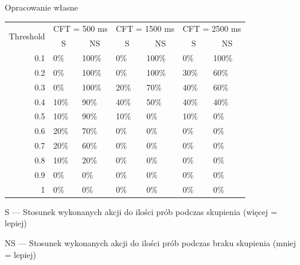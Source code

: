 \documentclass[skorowidz,skroty]{dyplomWEZUT}
\begin{document}
{Opracowanie własne}
{
    \begin{threeparttable}
        \begin{tabularx}{.95\linewidth}{r|X|X|X|X|X|X}
            \multirow{2}{*}{Threshold} & \multicolumn{2}{c|}{CFT = 500 ms} & \multicolumn{2}{c|}{CFT = 1500 ms} & \multicolumn{2}{c}{CFT = 2500 ms} \\ \cline{2-7} 
            \multicolumn{1}{c|}{} & \multicolumn{1}{c|}{S} & \multicolumn{1}{c|}{NS} & \multicolumn{1}{c|}{S} & \multicolumn{1}{c|}{NS} & \multicolumn{1}{c|}{S} & \multicolumn{1}{c}{NS} \\ \hline\hline
            0.1 & 0\% & 100\% & 0\% & 100\% & 0\% & 100\% \\ \hline
            0.2 & 0\% & 100\% & 0\% & 100\% & 30\% & 60\% \\ \hline
            0.3 & 0\% & 100\% & 20\% & 70\% & 40\% & 60\% \\ \hline
            0.4 & 10\% & 90\% & 40\% & 50\% & 40\% & 40\% \\ \hline
            0.5 & 10\% & 90\% & 10\% & 0\% & 10\% & 0\% \\ \hline
            0.6 & 20\% & 70\% & 0\% & 0\% & 0\% & 0\% \\ \hline
            0.7 & 20\% & 60\% & 0\% & 0\% & 0\% & 0\% \\ \hline
            0.8 & 10\% & 20\% & 0\% & 0\% & 0\% & 0\% \\ \hline
            0.9 & 0\% & 0\% & 0\% & 0\% & 0\% & 0\% \\ \hline
            1 & 0\% & 0\% & 0\% & 0\% & 0\% & 0\% \\
        \end{tabularx}
        \begin{tablenotes}
            \item \hphantom{N}S --- Stosunek wykonanych akcji do ilości prób podczas skupienia (więcej = lepiej)
            \item NS --- Stosunek wykonanych akcji do ilości prób podczas braku skupienia (mniej = lepiej)
        \end{tablenotes}
    \end{threeparttable}
}
\end{document}

